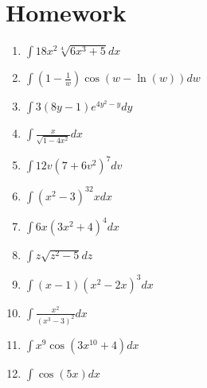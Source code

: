 \documentclass{article}[12pt]
\theoremstyle{definition}
\theoremstyle{example}
\theoremstyle{theorem}
\begin{document}
\section{Homework}
\begin{enumerate}
\item $\int 18x^2\sqrt[4]{6x^3+5}dx$
\item $\int(1-\frac{1}{w})\cos(w-\ln(w))dw$
\item $\int 3(8y-1)e^{4y^2-y}dy$
\item $\int \frac{x}{\sqrt{1-4x^2}}dx$
\item $\int 12v(7+6v^2)^7dv$
\item $\int (x^2-3)^32xdx$
\item $\int 6x(3x^2+4)^4dx$
\item $\int z\sqrt{z^2-5}dz$
\item $\int (x-1)(x^2-2x)^3dx$
\item $\int \frac{x^2}{(x^3-3)^2}dx$
\item $\int x^9\cos(3x^10+4)dx$
\item $\int \cos(5x)dx$
\end{enumerate}
\end{document}
